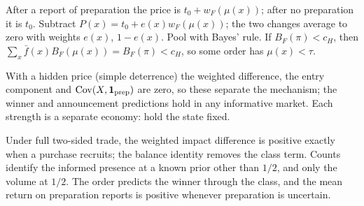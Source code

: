 {\small\begin{derivation}[proof]
After a report of preparation the price is \(t_0+w_F(\mu(x))\); after no preparation it is \(t_0\). Subtract
\(P(x)=t_0+e(x)w_F(\mu(x))\); the two changes average to zero with weights \(e(x)\), \(1-e(x)\). Pool with Bayes'
rule. If \(B_F(\pi)<c_H\), then \(\sum_x\bar f(x)B_F(\mu(x))=B_F(\pi)<c_H\), so some order has \(\mu(x)<\tau\).
\end{derivation}}

\begin{watchout}
With a hidden price (simple deterrence) the weighted difference, the entry component and \(\operatorname{Cov}(X,\mathbf{1}_{\rm prep})\) are
zero, so these separate the mechanism; the winner and announcement predictions hold in any informative market. Each
strength is a separate economy: hold the state fixed.
\end{watchout}

\begin{chaptersummary}
Under full two-sided trade, the weighted impact difference is positive exactly when a purchase recruits; the balance
identity removes the class term. Counts identify the informed presence at a known prior other than \(1/2\), and only
the volume at \(1/2\). The order predicts the winner through the class, and the mean return on preparation reports is
positive whenever preparation is uncertain.
\end{chaptersummary}

